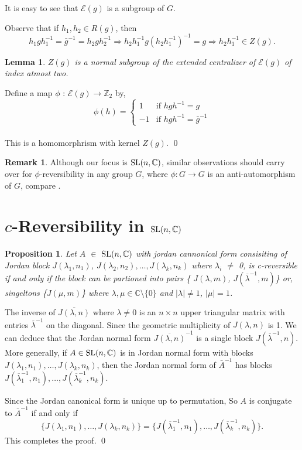 \documentclass[11pt]{amsart}
\renewenvironment{proof}{{\bfseries Proof.}}{\qed}
\numberwithin{equation}{section}
\theoremstyle{plain}
\newtheorem{pro}[theorem]{Proposition}
\newtheorem{lemma}[theorem]{Lemma}
\theoremstyle{definition}
\newtheorem{remark}[theorem]{Remark}
\newcommand{\C}{\mathbb{C}}
\numberwithin{equation}{section}
\def \SL{ {\rm SL}}
\begin{document}
 It is easy to see that \( \mathcal{E}(g) \) is a subgroup of \( G \).

Observe that if \( h_1, h_2 \in R(g) \), then
\[
h_1 g h_1^{-1} = \bar{g}^{-1} = h_2 g h_2^{-1}
\Rightarrow h_2 h_1^{-1} g (h_2 h_1^{-1})^{-1} = g
\Rightarrow h_2 h_1^{-1} \in Z(g).
\]
\begin{lemma}
	$Z(g)$ is a normal subgroup of the extended centralizer of $\mathcal{E}(g)$ of index atmost two.
	
\end{lemma}
\begin{proof}
	Define a map $\phi$ : $\mathcal{E}(g) \to \mathbb{Z}_{2}$ by,
	\[
	\displaystyle \phi(h) = \begin{cases} 
		1 & \text{if $hgh^{-1}=g$} \\  
		-1 & \text{if $hgh^{-1}=\bar{g}^{-1}$}
	\end{cases} \]
\\ This is a homomorphrism with kernel $Z(g)$.
\end{proof}
\begin{remark} Although our focus is $\SL(n, \C)$, similar observations should carry over for $\phi$-reversibility in any group $G$, where $\phi: G \to G$ is an anti-automorphism of $G$, compare \cite{dc}.
\end{remark} 

\section{$c$-Reversibility in ${\rm SL}(n, \C)$}\label{sec:SCR}

	\begin{pro}\label{JB}
		Let $A$ $\in$ ${\rm SL}(n,\mathbb{ C})$ with jordan cannonical form consisiting of Jordan block $J(\lambda_1,n_1)$, $J(\lambda_2,n_2), \ldots,  J(\lambda_k,n_k)$ where $\lambda_i$ $\neq$ 0, is c-reversible if and only if the block can be partioned into pairs \{ $J(\lambda,m)$, $J(\overline{\lambda}^{-1},m)$\} or, singeltons \{$J(\mu,m)$\} where $\lambda,\mu \in \mathbb{C}\setminus \{0\}$ and $|{\lambda}| \neq 1$, $|\mu|=1$.
	\end{pro}
	\begin{proof}
		The inverse of $\overline{J(\lambda,n)}$ where $\lambda \neq 0$ is an $n \times n$ upper triangular matrix with entries $\overline{\lambda}^{-1}$ on the diagonal. Since the geometric multiplicity of $J(\lambda,n)$ is 1. We can deduce that the Jordan normal form $\overline{J(\lambda,n)}^{-1}$ is a single block $J(\overline{\lambda}^{-1},n)$. More generally, if $A \in \SL(n,\mathbb{C})$ is in Jordan normal form with blocks $J(\lambda_{1},n_{1}),\ldots, J(\lambda_{k},n_{k})$,  then the Jordan normal form of $\bar{A}^{-1}$ has blocks $J(\overline \lambda_{1}^{-1},n_{1}),\ldots, J(\overline \lambda_{k}^{-1},n_{k})$.
		
		Since the Jordan canonical form is unique up to permutation, So $A$ is conjugate to $\overline{A}^{-1}$ if and only if
		$$\{J(\lambda_{1},n_{1}),\ldots,J(\lambda_{k},n_{k})\} = \{J(\overline \lambda_{1}^{-1},n_{1}),\ldots, J(\overline \lambda_{k}^{-1},n_{k})\}.$$
		This completes the proof. 
	\end{proof}
    \\
\end{document}
